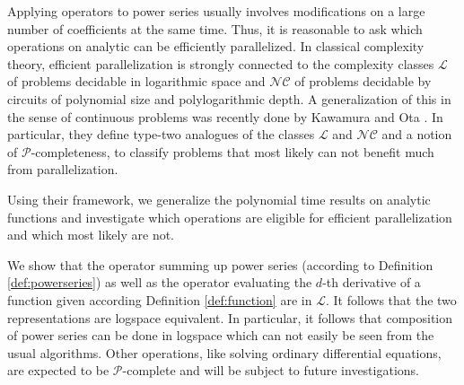 \documentclass[a4paper,11pt]{article}
\newcommand{\p}{\ensuremath{\mathcal P}\xspace}
\newcommand{\cl}{\ensuremath{\mathcal{L}}\xspace}
\newcommand{\nc}{\ensuremath{\mathcal{NC}}\xspace}
\begin{document}
Applying operators to power series usually involves modifications on a large number of coefficients at the same time.
Thus, it is reasonable to ask which operations on analytic can be efficiently parallelized.
In classical complexity theory, efficient parallelization is strongly connected to the complexity classes \cl of problems decidable in logarithmic space and \nc of problems decidable by circuits of polynomial size and polylogarithmic depth.
A generalization of this in the sense of continuous problems was recently done by Kawamura and Ota \cite{Kawamura2014}.
In particular, they define type-two analogues of the classes \cl and \nc and a notion of \p-completeness, to classify problems that most likely can not benefit much from parallelization.

Using their framework, we generalize the polynomial time results on analytic functions and investigate which operations are eligible for efficient parallelization and which most likely are not.

We show that the operator summing up power series (according to Definition \ref{def:powerseries}) as well as the operator evaluating the $d$-th derivative of a function given according Definition \ref{def:function} are in \cl.
It follows that the two representations are logspace equivalent.
In particular, it follows that composition of power series can be done in logspace which can not easily be seen from the usual algorithms.
Other operations, like solving ordinary differential equations, are expected to be \p-complete and will be subject to future investigations.


{}
\end{document}
